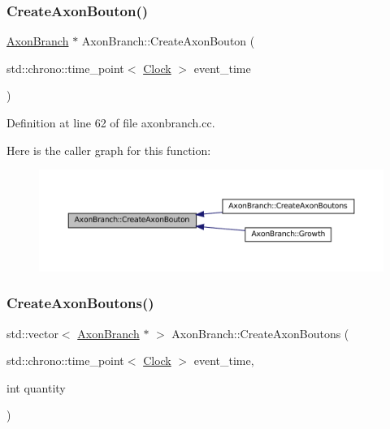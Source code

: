 \subsubsection{\texorpdfstring{Create\+Axon\+Bouton()}{CreateAxonBouton()}}
{\footnotesize\ttfamily \mbox{\hyperlink{class_axon_branch}{Axon\+Branch}} $\ast$ Axon\+Branch\+::\+Create\+Axon\+Bouton (\begin{DoxyParamCaption}\item[{std\+::chrono\+::time\+\_\+point$<$ \mbox{\hyperlink{universe_8h_a0ef8d951d1ca5ab3cfaf7ab4c7a6fd80}{Clock}} $>$}]{event\+\_\+time }\end{DoxyParamCaption})}



Definition at line 62 of file axonbranch.\+cc.

Here is the caller graph for this function\+:\nopagebreak
\begin{figure}[H]
\begin{center}
\leavevmode
\includegraphics[width=350pt]{class_axon_branch_a30b4602e5dd121666478ff9de52d022b_icgraph}
\end{center}
\end{figure}
\mbox{\label{class_axon_branch_a77e93626a7993f76e689d09721974e90}} 
\subsubsection{\texorpdfstring{Create\+Axon\+Boutons()}{CreateAxonBoutons()}}
{\footnotesize\ttfamily std\+::vector$<$ \mbox{\hyperlink{class_axon_branch}{Axon\+Branch}} $\ast$ $>$ Axon\+Branch\+::\+Create\+Axon\+Boutons (\begin{DoxyParamCaption}\item[{std\+::chrono\+::time\+\_\+point$<$ \mbox{\hyperlink{universe_8h_a0ef8d951d1ca5ab3cfaf7ab4c7a6fd80}{Clock}} $>$}]{event\+\_\+time,  }\item[{int}]{quantity }\end{DoxyParamCaption})}



